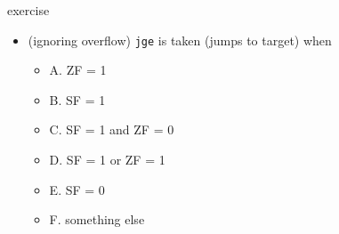 \begin{frame}{exercise}
\begin{itemize}
\item (ignoring overflow) \texttt{jge} is taken (jumps to target) when
    \begin{itemize}
    \item A. ZF = 1
    \item B. SF = 1
    \item C. SF = 1 and ZF = 0
    \item D. SF = 1 or ZF = 1
    \item E. SF = 0
    \item F. something else
    \end{itemize}
\end{itemize}
\end{frame}
